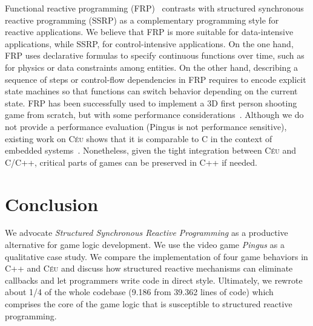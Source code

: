 \documentclass[10pt, conference, compsocconf]{IEEEtran}
\newcommand{\CEU}{\textsc{C\'{e}u}\xspace}
\begin{document}
Functional reactive programming (FRP)~\cite{frp.fran} contrasts with
structured synchronous reactive programming (SSRP) as a complementary
programming style for reactive applications.
%
We believe that FRP is more suitable for data-intensive applications, while 
SSRP, for control-intensive applications.
%
On the one hand, FRP uses declarative formulas to specify continuous functions 
over time, such as for physics or data constraints among entities.
%
On the other hand, describing a sequence of steps or control-flow dependencies
in FRP requires to encode explicit state machines so that functions can switch
behavior depending on the current state.
%
FRP has been successfully used to implement a 3D first person shooting game
from scratch, but with some performance considerations~\cite{games.frag}.
%
Although we do not provide a performance evaluation (Pingus is not performance
sensitive), existing work on \CEU shows that it is comparable to C in the
context of embedded systems~\cite{ceu.sensys13}.
Nonetheless, given the tight integration between \CEU and C/C++, critical parts
of games can be preserved in C++ if needed.

\section{Conclusion}
\label{sec.conclusion}

We advocate \emph{Structured Synchronous Reactive Programming} as a productive
alternative for game logic development.
%
We use the video game \emph{Pingus} as a qualitative case study.
We compare the implementation of four game behaviors in C++ and \CEU and
discuss how structured reactive mechanisms can eliminate callbacks and let
programmers write code in direct style.
%
Ultimately, we rewrote about 1/4 of the whole codebase (9.186 from 39.362 lines
of code) which comprises the core of the game logic that is susceptible to
structured reactive programming.
\end{document}
